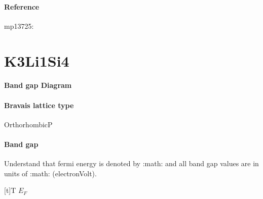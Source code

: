 \documentclass[letterpaper,10pt,english]{sphinxmanual}
\begin{document}
\subsubsection*{Reference}

\sphinxAtStartPar
mp\sphinxhyphen{}13725: 

\sphinxstepscope


\chapter{K3Li1Si4}
\label{\detokenize{K3Li1Si4/K3Li1Si4:k3li1si4}}\label{\detokenize{K3Li1Si4/K3Li1Si4::doc}}\subsubsection*{Band gap Diagram}

\noindent{}
\subsubsection*{Bravais lattice type}

\sphinxAtStartPar
OrthorhombicP
\subsubsection*{Band gap}

\sphinxAtStartPar
Understand that fermi energy is denoted by :math: and all band gap values are in units of :math: (electron\sphinxhyphen{}Volt).


\begin{savenotes}\sphinxattablestart
\sphinxthistablewithglobalstyle
\centering
\begin{tabulary}{\linewidth}[t]{T}
\sphinxtoprule
\sphinxstyletheadfamily 
\sphinxAtStartPar
\(E_F\)
\\
\sphinxmidrule
\sphinxtableatstartofbodyhook
{}
\\
\sphinxbottomrule
\end{tabulary}
\sphinxtableafterendhook\par
\sphinxattableend\end{savenotes}
\end{document}

